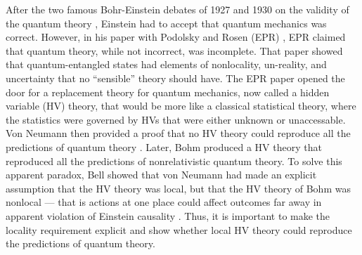 \documentclass[aps,prl,twocolumn,amsmath,amssymb,nofootinbib,superscriptaddress]{revtex4-1}
\begin{document}
\maketitle

After the two famous Bohr-Einstein debates of 1927 and 1930 on the validity of the quantum theory \cite{bohr1996discussion}, Einstein had to accept that quantum mechanics was correct. However, in his paper with Podolsky and Rosen (EPR) \cite{Einstein1935}, EPR claimed that quantum theory, while not incorrect, was incomplete. That paper showed that quantum-entangled states had elements of nonlocality, un-reality, and uncertainty that no ``sensible'' theory should have. The EPR paper opened the door for a replacement theory for quantum mechanics, now called a hidden variable (HV) theory, that would be more like a classical statistical theory, where the statistics were governed by HVs that were either unknown or unaccessable. Von Neumann then provided a proof that no HV theory could reproduce all the predictions of quantum theory \cite{neumann1932}. Later, Bohm produced a HV theory that reproduced all the predictions of nonrelativistic quantum theory. To solve this apparent paradox, Bell showed that von Neumann had made an explicit assumption that the HV theory was local, but that the HV theory of Bohm was nonlocal --- that is actions at one place could affect outcomes far away in apparent violation of Einstein causality \cite{Bell1965}. Thus, it is important to make the locality requirement explicit and show whether local HV theory could reproduce the predictions of quantum theory.

\end{document}
